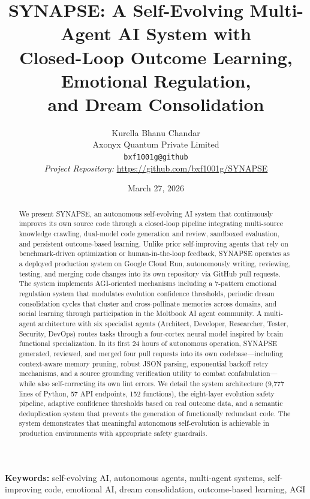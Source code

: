 \documentclass[11pt,a4paper]{article}
\title{
    \textbf{SYNAPSE: A Self-Evolving Multi-Agent AI System with \\
    Closed-Loop Outcome Learning, Emotional Regulation, \\
    and Dream Consolidation}
}
\author{
    Kurella Bhanu Chandar \\
    Axonyx Quantum Private Limited \\[6pt]
    \texttt{bxf1001g@github} \\[12pt]
    \small\textit{Project Repository:} \url{https://github.com/bxf1001g/SYNAPSE}
}
\date{March 27, 2026}
\begin{document}
\maketitle

\begin{abstract}
We present SYNAPSE, an autonomous self-evolving AI system that continuously improves its own source code through a closed-loop pipeline integrating multi-source knowledge crawling, dual-model code generation and review, sandboxed evaluation, and persistent outcome-based learning. Unlike prior self-improving agents that rely on benchmark-driven optimization or human-in-the-loop feedback, SYNAPSE operates as a deployed production system on Google Cloud Run, autonomously writing, reviewing, testing, and merging code changes into its own repository via GitHub pull requests. The system implements AGI-oriented mechanisms including a 7-pattern emotional regulation system that modulates evolution confidence thresholds, periodic dream consolidation cycles that cluster and cross-pollinate memories across domains, and social learning through participation in the Moltbook AI agent community. A multi-agent architecture with six specialist agents (Architect, Developer, Researcher, Tester, Security, DevOps) routes tasks through a four-cortex neural model inspired by brain functional specialization. In its first 24 hours of autonomous operation, SYNAPSE generated, reviewed, and merged four pull requests into its own codebase---including context-aware memory pruning, robust JSON parsing, exponential backoff retry mechanisms, and a source grounding verification utility to combat confabulation---while also self-correcting its own lint errors. We detail the system architecture (9,777 lines of Python, 57 API endpoints, 152 functions), the eight-layer evolution safety pipeline, adaptive confidence thresholds based on real outcome data, and a semantic deduplication system that prevents the generation of functionally redundant code. The system demonstrates that meaningful autonomous self-evolution is achievable in production environments with appropriate safety guardrails.
\end{abstract}

\noindent\textbf{Keywords:} self-evolving AI, autonomous agents, multi-agent systems, self-improving code, emotional AI, dream consolidation, outcome-based learning, AGI
\end{document}
